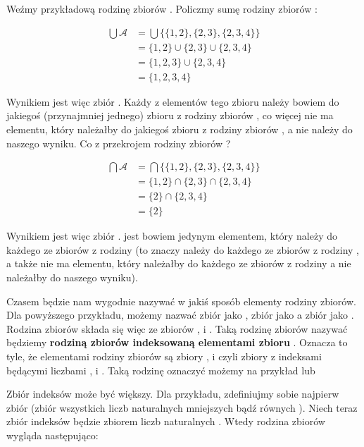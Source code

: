 Weźmy przykładową rodzinę zbiorów . Policzmy sumę rodziny zbiorów :

\[
\begin{split}
\bigcup \mathcal{A} 
&= \bigcup \{ \{ 1,2 \}, \{ 2,3 \}, \{ 2,3,4 \} \} 
\\& = \{ 1,2 \} \cup \{ 2,3 \} \cup \{ 2,3,4 \}
\\& = \{ 1,2,3 \} \cup \{ 2,3,4 \}
\\& = \{ 1,2,3,4 \}
\end{split}
\]

Wynikiem jest więc zbiór . Każdy z elementów tego zbioru należy bowiem do jakiegoś (przynajmniej jednego) zbioru z rodziny zbiorów , co więcej nie ma elementu, który należałby do jakiegoś zbioru z rodziny zbiorów , a nie należy do naszego wyniku. Co z przekrojem rodziny zbiorów ?

\[
\begin{split}
\bigcap \mathcal{A} 
&= \bigcap \{ \{ 1,2 \}, \{ 2,3 \}, \{ 2,3,4 \} \} 
\\& = \{ 1,2 \} \cap \{ 2,3 \} \cap \{ 2,3,4 \}
\\& = \{ 2 \} \cap \{ 2,3,4 \}
\\& = \{ 2 \}
\end{split}
\]

Wynikiem jest więc zbiór .  jest bowiem jedynym elementem, który należy do każdego ze zbiorów z rodziny  (to znaczy należy do każdego ze zbiorów z rodziny , a także nie ma elementu, który należałby do każdego ze zbiorów z rodziny  a nie należałby do naszego wyniku).

Czasem będzie nam wygodnie nazywać w jakiś sposób elementy rodziny zbiorów. Dla powyższego przykładu, możemy nazwać zbiór  jako , zbiór  jako  a zbiór  jako . Rodzina zbiorów  składa się więc ze zbiorów ,  i . Taką rodzinę zbiorów  nazywać będziemy \textbf{rodziną zbiorów indeksowaną elementami zbioru }. Oznacza to tyle, że elementami rodziny zbiorów  są zbiory ,  i  czyli zbiory  z indeksami będącymi liczbami ,  i . Taką rodzinę oznaczyć możemy na przykład  lub 

Zbiór indeksów może być większy. Dla przykładu, zdefiniujmy sobie najpierw zbiór  (zbiór wszystkich liczb naturalnych mniejszych bądź równych ). Niech teraz zbiór indeksów będzie zbiorem liczb naturalnych . Wtedy rodzina zbiorów  wygląda następująco:

